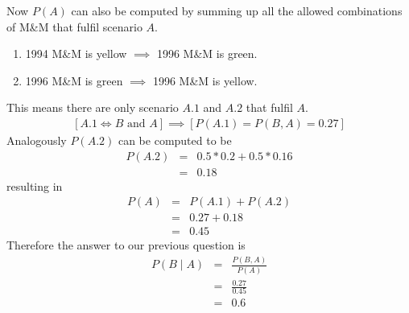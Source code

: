 \documentclass{article}
\begin{document}
	Now $P(A)$ can also be computed by summing up all the allowed combinations of M\&M that fulfil scenario $A$.\\
	\begin{enumerate}[label=A.\arabic*]
		\item 1994 M\&M is yellow $\implies$ 1996 M\&M is green.
		\item 1996 M\&M is green $\implies$ 1996 M\&M is yellow.
	\end{enumerate}
	This means there are only scenario $A.1$ and $A.2$ that fulfil $A$.
	\begin{eqnarray*}
		\left[A.1 \Leftrightarrow B \text{ and } A\right] \implies \left[P(A.1) = P(B, A) = 0.27\right]
	\end{eqnarray*}
	Analogously $P(A.2)$ can be computed to be
	\begin{eqnarray*}
		P(A.2) &=& 0.5 * 0.2 + 0.5 * 0.16\\
		&=& 0.18
	\end{eqnarray*}
	resulting in
	\begin{eqnarray*}
		P(A) &=& P(A.1) + P(A.2)\\
		&=& 0.27 + 0.18\\
		&=& 0.45
	\end{eqnarray*}
	Therefore the answer to our previous question is
	\begin{eqnarray*}
		P(B \mid A) &=& \frac{P(B, A)}{P(A)}\\
		&=& \frac{0.27}{0.45}\\
		&=& 0.6
	\end{eqnarray*}
\end{document}
